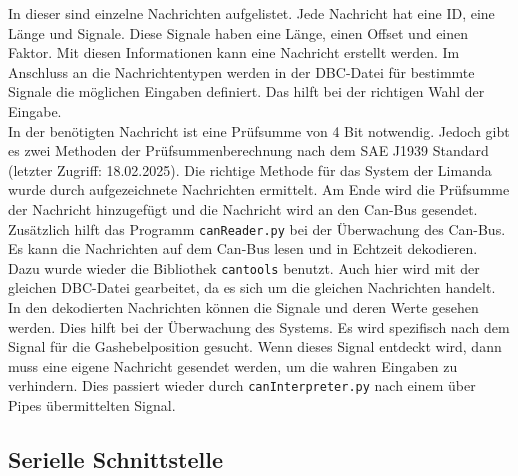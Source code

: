 In dieser sind einzelne Nachrichten aufgelistet. Jede Nachricht hat eine ID, eine Länge und Signale. Diese Signale
haben eine Länge, einen Offset und einen Faktor. Mit diesen Informationen kann eine Nachricht erstellt werden.
Im Anschluss an die Nachrichtentypen werden in der DBC-Datei für bestimmte Signale die möglichen Eingaben definiert.
Das hilft bei der richtigen Wahl der Eingabe. \\
In der benötigten Nachricht ist eine Prüfsumme von 4 Bit notwendig. Jedoch gibt es zwei Methoden der Prüfsummenberechnung
nach dem SAE J1939 Standard \cite{VectorSAE} (letzter Zugriff: 18.02.2025). Die richtige Methode für das System der 
Limanda wurde durch aufgezeichnete Nachrichten ermittelt. Am Ende wird die Prüfsumme der Nachricht hinzugefügt und die
Nachricht wird an den Can-Bus gesendet. \\
Zusätzlich hilft das Programm \texttt{canReader.py} bei der Überwachung des Can-Bus. Es kann die Nachrichten auf dem
Can-Bus lesen und in Echtzeit dekodieren. Dazu wurde wieder die Bibliothek \texttt{cantools} benutzt. Auch hier wird
mit der gleichen DBC-Datei gearbeitet, da es sich um die gleichen Nachrichten handelt. In den dekodierten Nachrichten
können die Signale und deren Werte gesehen werden. Dies hilft bei der Überwachung des Systems. Es wird spezifisch nach
dem Signal für die Gashebelposition gesucht. Wenn dieses Signal entdeckt wird, dann muss eine eigene Nachricht
gesendet werden, um die wahren Eingaben zu verhindern. Dies passiert wieder durch \texttt{canInterpreter.py} nach 
einem über Pipes übermittelten Signal.  \\

\subsection{Serielle Schnittstelle}

